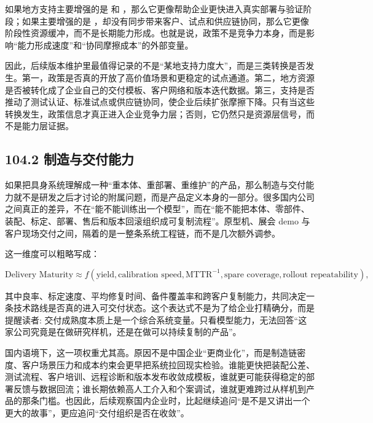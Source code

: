 如果地方支持主要增强的是 \texttt{} 和 \texttt{}，那么它更像帮助企业更快进入真实部署与验证阶段；如果主要增强的是 \texttt{}，却没有同步带来客户、试点和供应链协同，那么它更像阶段性资源缓冲，而不是长期能力形成。也就是说，政策不是竞争力本身，而是影响“能力形成速度”和“协同摩擦成本”的外部变量。

因此，后续版本维护里最值得记录的不是“某地支持力度大”，而是三类转换是否发生。第一，政策是否真的开放了高价值场景和更稳定的试点通道。第二，地方资源是否被转化成了企业自己的交付模板、客户网络和版本迭代数据。第三，支持是否推动了测试认证、标准试点或供应链协同，使企业后续扩张摩擦下降。只有当这些转换发生，政策信息才真正进入企业竞争力层；否则，它仍然只是资源层信号，而不是能力层证据。

\subsection*{104.2 制造与交付能力}


如果把具身系统理解成一种“重本体、重部署、重维护”的产品，那么制造与交付能力就不是研发之后才讨论的附属问题，而是产品定义本身的一部分。很多国内公司之间真正的差异，不在“能不能训练出一个模型”，而在“能不能把本体、零部件、装配、标定、部署、售后和版本回滚组织成可复制流程”。原型机、展会 demo 与客户现场交付之间，隔着的是一整条系统工程链，而不是几次额外调参。

这一维度可以粗略写成：

\begingroup
\scriptsize
\begin{equation*}
\text{Delivery Maturity} \approx f(\text{yield}, \text{calibration speed}, \text{MTTR}^{-1}, \text{spare coverage}, \text{rollout repeatability}),
\end{equation*}
\endgroup

其中良率、标定速度、平均修复时间、备件覆盖率和跨客户复制能力，共同决定一条技术路线是否真的进入可交付状态。这个表达式不是为了给企业打精确分，而是提醒读者: 交付成熟度本质上是一个综合系统变量。只看模型能力，无法回答“这家公司究竟是在做研究样机，还是在做可以持续复制的产品”。

国内语境下，这一项权重尤其高。原因不是中国企业“更商业化”，而是制造链密度、客户场景压力和成本约束会更早把系统拉回现实检验。谁能更快把装配公差、测试流程、客户培训、远程诊断和版本发布收敛成模板，谁就更可能获得稳定的部署反馈与数据回流；谁长期依赖高人工介入和个案调试，谁就更难跨过从样机到产品的那条门槛。也因此，后续观察国内企业时，比起继续追问“是不是又讲出一个更大的故事”，更应追问“交付组织是否在收敛”。


